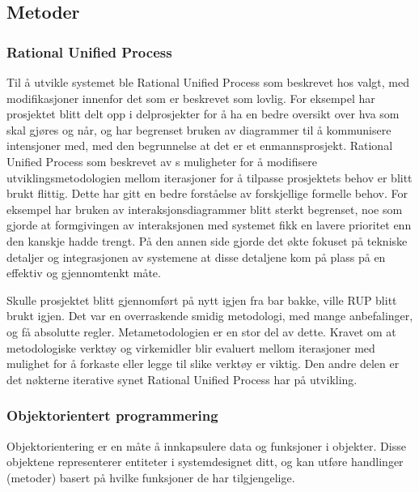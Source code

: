 \documentclass[11pt]{article}
\begin{document}
\subsection{Metoder}



\subsubsection{Rational Unified Process}



Til å utvikle systemet ble Rational Unified Process som beskrevet hos \cite{Larman2011} valgt, med modifikasjoner innenfor det som er beskrevet som lovlig. For eksempel har prosjektet blitt delt opp i delprosjekter for å ha en bedre oversikt over hva som skal gjøres og når, og har begrenset bruken av diagrammer til å kommunisere intensjoner med, med den begrunnelse at det er et enmannsprosjekt. Rational Unified Process som beskrevet av \cite{Larman2011}s muligheter for å modifisere utviklingsmetodologien mellom iterasjoner for å tilpasse prosjektets behov er blitt brukt flittig. Dette har gitt en bedre forståelse av forskjellige formelle behov. For eksempel har bruken av interaksjonsdiagrammer blitt sterkt begrenset, noe som gjorde at formgivingen av interaksjonen med systemet fikk en lavere prioritet enn den kanskje hadde trengt. På den annen side gjorde det økte fokuset på tekniske detaljer og integrasjonen av systemene at disse detaljene kom på plass på en effektiv og gjennomtenkt måte.



Skulle prosjektet blitt gjennomført på nytt igjen fra bar bakke, ville RUP blitt brukt igjen. Det var en overraskende smidig metodologi, med mange anbefalinger, og få absolutte regler. Metametodologien er en stor del av dette. Kravet om at metodologiske verktøy og virkemidler blir evaluert mellom iterasjoner med mulighet for å forkaste eller legge til slike verktøy er viktig. Den andre delen er det nøkterne iterative synet Rational Unified Process har på utvikling. 



\subsubsection{Objektorientert programmering}



Objektorientering er en måte å innkapsulere data og funksjoner i objekter. Disse objektene representerer entiteter i systemdesignet ditt, og kan utføre handlinger (metoder) basert på hvilke funksjoner de har tilgjengelige. 
\end{document}
